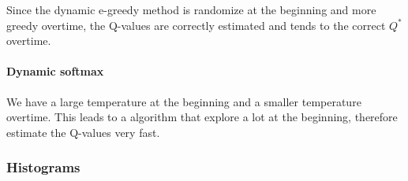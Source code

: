 \documentclass[letterpaper]{article}
\begin{document}
Since the dynamic e-greedy method is randomize at the beginning and
more greedy overtime, the Q-values are correctly estimated and tends to
the correct $Q^*$ overtime.

\paragraph{Dynamic softmax}

We have a large temperature at the beginning and a smaller temperature overtime.
This leads to a algorithm that explore a lot at the beginning, therefore
estimate the Q-values very fast.

\subsubsection{Histograms}
\end{document}
